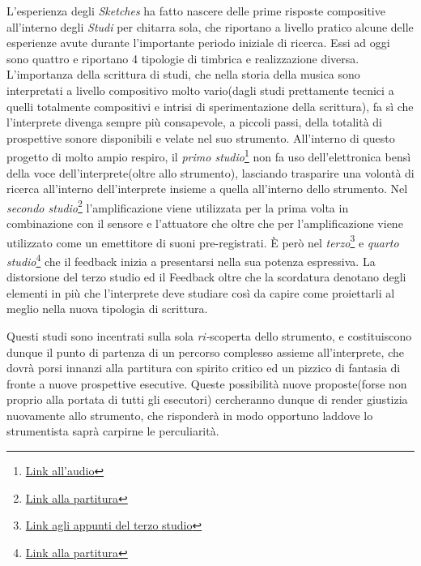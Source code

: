 \documentclass[oneside]{article}
\begin{document}
\begin{multicols*}{2}
L'esperienza degli \textit{Sketches} ha fatto nascere delle prime risposte compositive all'interno degli \textit{Studi} per chitarra sola, che riportano a livello pratico alcune delle esperienze avute durante l'importante periodo iniziale di ricerca. Essi ad oggi sono quattro e riportano 4 tipologie di timbrica e realizzazione diversa.
L'importanza della scrittura di studi, che nella storia della musica sono interpretati a livello compositivo molto vario(dagli studi prettamente tecnici a quelli totalmente compositivi e intrisi di sperimentazione della scrittura), fa sì che l'interprete divenga sempre più consapevole, a piccoli passi, della totalità di prospettive sonore disponibili e velate nel suo strumento. All'interno di questo progetto di molto ampio respiro, il \textit{primo studio}\footnote{\href{https://github.com/SMERM/BN-Tedesco/blob/master/COME-02/Lezioni_in_Compresenza/20200331/Draft_1_Studio_n.1_Audio.wav}{Link all'audio}} non fa uso dell'elettronica bensì della voce dell'interprete(oltre allo strumento), lasciando trasparire una volontà di ricerca all'interno dell'interprete insieme a quella all'interno dello strumento. Nel \textit{secondo studio}\footnote{\href{https://github.com/SMERM/BN-Tedesco/blob/master/COME-02/Lezioni_in_Compresenza/20200407/Draft_1\%20Studio\%20n.2\%20Partitura.pdf}{Link alla partitura}} l'amplificazione viene utilizzata per la prima volta in combinazione con il sensore e l'attuatore che oltre che per l'amplificazione viene utilizzato come un emettitore di suoni pre-registrati. È però nel \textit{terzo}\footnote{\href{https://github.com/SMERM/BN-Tedesco/blob/master/COME-02/Lezioni_in_Compresenza/20200519/Appunti_Studio_n.3_a.jpeg}{Link agli appunti del terzo studio}} e \textit{quarto studio}\footnote{\href{https://github.com/SMERM/BN-Tedesco/blob/master/COME-02/Lezioni_in_Compresenza/20200616/Studio_n.4_a.pdf}{Link alla partitura}} che il feedback inizia a presentarsi nella sua potenza espressiva. La distorsione del terzo studio ed il Feedback oltre che la scordatura denotano degli elementi in più che l'interprete deve studiare così da capire come proiettarli al meglio nella nuova tipologia di scrittura.

Questi studi sono incentrati sulla sola \textit{ri-}scoperta dello strumento, e costituiscono dunque il punto di partenza di un percorso complesso assieme all'interprete, che dovrà porsi innanzi alla partitura con spirito critico ed un pizzico di fantasia di fronte a nuove prospettive esecutive. Queste possibilità nuove proposte(forse non proprio alla portata di tutti gli esecutori) cercheranno dunque di render giustizia nuovamente allo strumento, che risponderà in modo opportuno laddove lo strumentista saprà carpirne le perculiarità. 


\end{multicols*}
\end{document}
